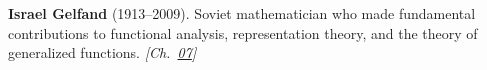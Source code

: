 \textbf{Israel Gelfand} (1913–2009). Soviet mathematician who made fundamental contributions to functional analysis, representation theory, and the theory of generalized functions. \emph{[Ch.~\hyperref[ch:billiardsconicsporism]{07}]}

